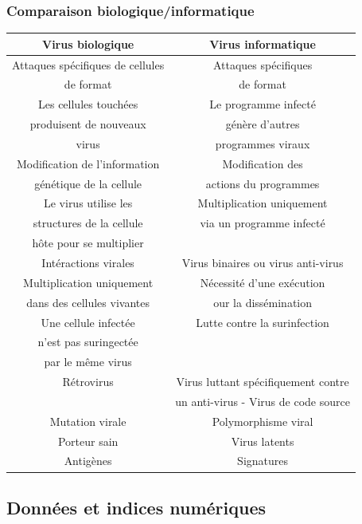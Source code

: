 \documentclass{beamer}
\begin{document}
\begin{frame}
\frametitle{Comparaison biologique/informatique}
{\scriptsize
\begin{center}
\begin{tabular}{|c|c|}
\hline
Virus biologique & Virus informatique \\
\hline 
\hline
Attaques spécifiques de cellules & Attaques spécifiques \\
de format & de format \\
\hline
Les cellules touchées & Le programme infecté \\
produisent de nouveaux  & génère d'autres \\
virus & programmes viraux \\
\hline
Modification  de l'information & Modification des \\
génétique de la cellule & actions du programmes \\
\hline
Le virus utilise les & Multiplication uniquement \\
structures de la  cellule & via un programme infecté \\
hôte pour se multiplier & \\
\hline
Intéractions virales & Virus binaires ou virus anti-virus \\
Multiplication uniquement & Nécessité d'une exécution \\
dans des cellules vivantes & our la dissémination \\
\hline
Une cellule infectée & Lutte contre la surinfection \\
n'est pas suringectée & \\
par le même virus & \\
\hline
Rétrovirus & Virus luttant spécifiquement contre \\
& un anti-virus - Virus de code source \\
\hline
Mutation virale & Polymorphisme viral \\
\hline
Porteur sain & Virus latents \\
\hline
Antigènes & Signatures \\
\hline
\end{tabular}
\end{center}
}
\end{frame}





\subsection{Données et indices numériques}
\end{document}
